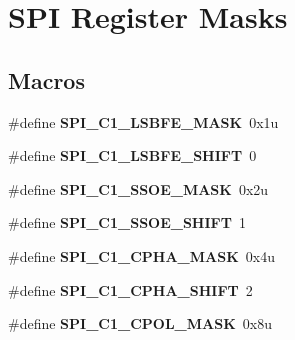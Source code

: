 \hypertarget{group___s_p_i___register___masks}{}\section{S\+P\+I Register Masks}
\label{group___s_p_i___register___masks}
\subsection*{Macros}
\begin{DoxyCompactItemize}
\item 
\hypertarget{group___s_p_i___register___masks_ga45f4cb42020607c9ed927bf57cc0ee31}{}\#define {\bfseries S\+P\+I\+\_\+\+C1\+\_\+\+L\+S\+B\+F\+E\+\_\+\+M\+A\+S\+K}~0x1u\label{group___s_p_i___register___masks_ga45f4cb42020607c9ed927bf57cc0ee31}

\item 
\hypertarget{group___s_p_i___register___masks_gaa81af414d42c393342df48ae8d44c27f}{}\#define {\bfseries S\+P\+I\+\_\+\+C1\+\_\+\+L\+S\+B\+F\+E\+\_\+\+S\+H\+I\+F\+T}~0\label{group___s_p_i___register___masks_gaa81af414d42c393342df48ae8d44c27f}

\item 
\hypertarget{group___s_p_i___register___masks_ga18d4e12a34e268e98cf29ef47ff46e21}{}\#define {\bfseries S\+P\+I\+\_\+\+C1\+\_\+\+S\+S\+O\+E\+\_\+\+M\+A\+S\+K}~0x2u\label{group___s_p_i___register___masks_ga18d4e12a34e268e98cf29ef47ff46e21}

\item 
\hypertarget{group___s_p_i___register___masks_gaa5941a1db540652e8da7f3881eb39384}{}\#define {\bfseries S\+P\+I\+\_\+\+C1\+\_\+\+S\+S\+O\+E\+\_\+\+S\+H\+I\+F\+T}~1\label{group___s_p_i___register___masks_gaa5941a1db540652e8da7f3881eb39384}

\item 
\hypertarget{group___s_p_i___register___masks_gaaf85a831465f0f4f302657b32171f2e6}{}\#define {\bfseries S\+P\+I\+\_\+\+C1\+\_\+\+C\+P\+H\+A\+\_\+\+M\+A\+S\+K}~0x4u\label{group___s_p_i___register___masks_gaaf85a831465f0f4f302657b32171f2e6}

\item 
\hypertarget{group___s_p_i___register___masks_gaa305ee06e9cb66ad7ba9aed297debef3}{}\#define {\bfseries S\+P\+I\+\_\+\+C1\+\_\+\+C\+P\+H\+A\+\_\+\+S\+H\+I\+F\+T}~2\label{group___s_p_i___register___masks_gaa305ee06e9cb66ad7ba9aed297debef3}

\item 
\hypertarget{group___s_p_i___register___masks_ga8f4bd038e37f3581231f26aafc33c7b1}{}\#define {\bfseries S\+P\+I\+\_\+\+C1\+\_\+\+C\+P\+O\+L\+\_\+\+M\+A\+S\+K}~0x8u\label{group___s_p_i___register___masks_ga8f4bd038e37f3581231f26aafc33c7b1}


\end{DoxyCompactItemize}
